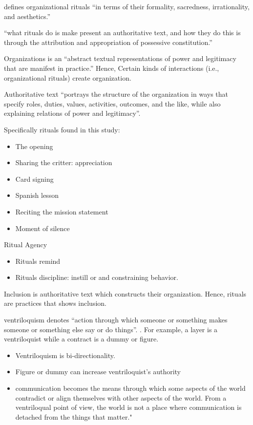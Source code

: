 \documentclass[
]{book}
\providecommand{\tightlist}{%
  \setlength{\itemsep}{0pt}\setlength{\parskip}{0pt}}
\begin{document}
\citep{Koschmann_2015}

\citep{Knuf_1993} defines organizational rituals ``in terms of their formality, sacredness, irrationality, and aesthetics.''

``what rituals do is make present an authoritative text, and how they do this is through the attribution and
appropriation of possessive constitution.''

Organizations is an ``abstract textual representations of power and legitimacy that are manifest in practice.'' Hence,
Certain kinds of interactions (i.e., organizational rituals) create organization.

Authoritative text ``portrays the structure of the organization in ways that specify roles, duties, values, activities,
outcomes, and the like, while also explaining relations of power and legitimacy''.

Specifically rituals found in this study:

\begin{itemize}
\tightlist
\item
  The opening
\item
  Sharing the critter: appreciation
\item
  Card signing
\item
  Spanish lesson
\item
  Reciting the mission statement
\item
  Moment of silence
\end{itemize}

Ritual Agency

\begin{itemize}
\tightlist
\item
  Rituals remind
\item
  Rituals discipline: instill or and constraining behavior.
\end{itemize}

Inclusion is authoritative text which constructs their organization. Hence, rituals are practices that shows inclusion.

\citep{Cooren_2015}

ventriloquism denotes ``action through which someone or something makes someone or something else say or do things''.
\citep{Cooren_2010}. For example, a layer is a ventriloquist while a contract is a dummy or figure.

\begin{itemize}
\tightlist
\item
  Ventriloquism is bi-directionality.
\item
  Figure or dummy can increase ventriloquist's authority
\item
  communication becomes the means through which some aspects of the world contradict or align themselves with other
  aspects of the world. From a ventriloqual point of view, the world is not a place where communication is detached
  from the things that matter."
\end{itemize}
\end{document}
